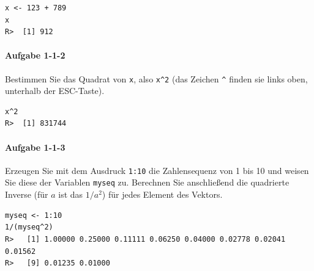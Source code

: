 \documentclass[normalheadings, 10pt]{scrartcl}\usepackage{graphicx, color}
\makeatletter
\newenvironment{kframe}{%
 \def\at@end@of@kframe{}%
 \ifinner\ifhmode%
  \def\at@end@of@kframe{\end{minipage}}%
  \begin{minipage}{\columnwidth}%
 \fi\fi%
 \def\FrameCommand##1{\hskip\@totalleftmargin \hskip-\fboxsep
 \colorbox{shadecolor}{##1}\hskip-\fboxsep
     \hskip-\linewidth \hskip-\@totalleftmargin \hskip\columnwidth}%
 \MakeFramed {\advance\hsize-\width
   \@totalleftmargin\z@ \linewidth\hsize
   \@setminipage}}%
 {\par\unskip\endMakeFramed%
 \at@end@of@kframe}
\newenvironment{knitrout}{}{} %
\newcommand{\code}[1]{\texttt{#1}}
\makeatother
\begin{document}
\begin{rbsp}
\begin{knitrout}
\color{fgcolor}\begin{kframe}
\begin{verbatim}
x <- 123 + 789
x
R>  [1] 912
\end{verbatim}
\end{kframe}
\end{knitrout}

\end{rbsp}


\paragraph{Aufgabe 1-1-2} Bestimmen Sie das Quadrat von \code{x}, also
\verb|x^2| (das Zeichen \code{\^} finden sie links oben, unterhalb der
ESC-Taste).

\begin{rbsp}
\begin{knitrout}
\color{fgcolor}\begin{kframe}
\begin{verbatim}
x^2
R>  [1] 831744
\end{verbatim}
\end{kframe}
\end{knitrout}

\end{rbsp}


\paragraph{Aufgabe 1-1-3} Erzeugen Sie mit dem Ausdruck \code{1:10} die
Zahlensequenz von 1 bis 10 und weisen Sie diese der Variablen \code{myseq}
zu. Berechnen Sie anschließend die quadrierte Inverse (für $a$ ist das
$1/a^2$) für jedes Element des Vektors.

\begin{rbsp}
\begin{knitrout}
\color{fgcolor}\begin{kframe}
\begin{verbatim}
myseq <- 1:10
1/(myseq^2)
R>   [1] 1.00000 0.25000 0.11111 0.06250 0.04000 0.02778 0.02041 0.01562
R>   [9] 0.01235 0.01000
\end{verbatim}
\end{kframe}
\end{knitrout}

\end{rbsp}
\end{document}
